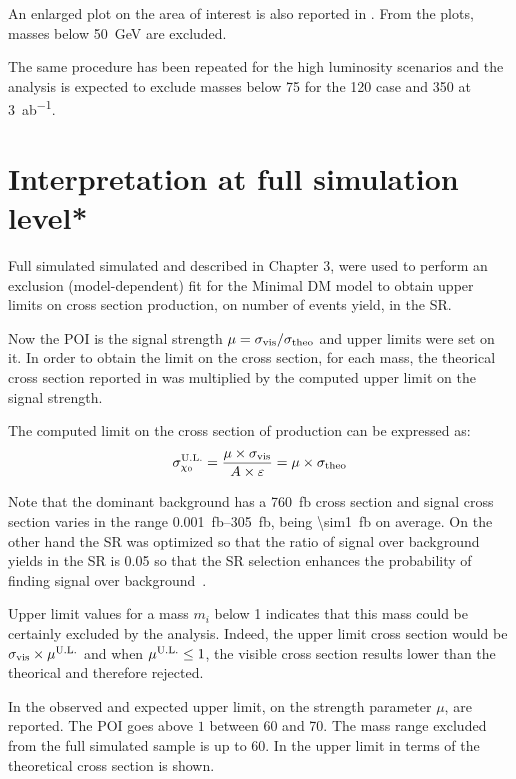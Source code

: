 An enlarged plot on the area of interest is also reported in  \Fig{\ref{subfig:exclMIZ}}. From the plots, \chizero masses below \SI{50}{\GeV} are excluded.

The same procedure has been repeated for the high luminosity scenarios and the analysis is expected to exclude masses below \SI{75}{\gev} for the \SI{120}{\ifb} case and \SI{350}{\gev} at \SI{3}{ab^{-1}}. 

\section{Interpretation at full simulation level*}
\label{sec:full}
Full simulated simulated and described in Chapter 3, were used to perform an exclusion (model-dependent) fit for the Minimal DM model to obtain upper limits on \chizero cross section production, on number of events yield, in the SR.

Now the POI is the signal strength $\mu=\sigma_\textup{{vis}}/\sigma_{\textup{theo}}$ and upper limits were set on it. In order to obtain the limit on the cross section, for each mass, the theorical cross section reported in \Tab{\ref{tab:eff}} was multiplied by the computed upper limit on the signal strength. 

The computed limit on the cross section of \chizero production can be expressed as:
\begin{equation}
	\sigma_{\chi_0}^\textup{U.L.}=\frac{\mu\times\sigma_\textup{vis}}{A\times\epsilon}=\mu\times\sigma_\textup{theo}
\end{equation}

Note that the dominant background \znng has a \SI{760}{fb} cross section and signal cross section varies in the range \SIrange{0.001}{305}{fb}, being \SI{\sim1}{fb} on average. On the other hand the SR was optimized so that the ratio of signal over background yields in the SR is \num{0.05} so that the SR selection enhances the probability of finding signal over background~\cite{mgiulia}.

Upper limit values for a mass $m_i$ below \num{1} indicates that this mass could be certainly excluded by the analysis. Indeed, the upper limit cross section would be $\sigma_\textup{vis}\times \mu^\textup{U.L.}$ and when $\mu^\textup{U.L.} \le 1$, the visible cross section results lower than the theorical and therefore rejected.

In \Tab{\ref{tab:mu}} the observed and expected upper limit, on the strength parameter $\mu$, are reported. The POI goes above $1$ between \SI{60}{\gev} and \SI{70}{\gev}. The mass range excluded from the full simulated sample is up to \SI{60}{\gev}. In \Fig{\ref{subfig:exclMD}} the upper limit in terms of the theoretical cross section is shown. 

